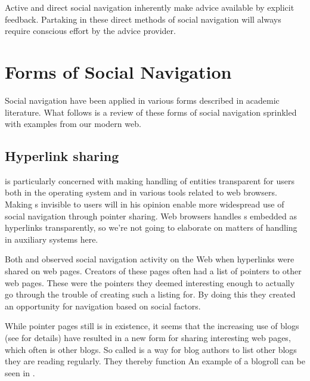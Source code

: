 Active and direct social navigation inherently make advice available by
explicit feedback. Partaking in these direct methods of social navigation
will always require conscious effort by the advice provider.

\section{Forms of Social Navigation}

Social navigation have been applied in various forms described in
academic literature. What follows is a review of these forms of social
navigation sprinkled with examples from our modern web.

\subsection{Hyperlink sharing}

\citet{dieberger97} is particularly concerned with making handling of
%
entities transparent for users both in the operating system and in various
tools related to web browsers. Making s invisible to users will in
his opinion enable more widespread use of social navigation through pointer
sharing. Web browsers handles s embedded as hyperlinks
transparently,
so we're not going to elaborate on matters of  handling in
auxiliary systems here.

Both \cite{dourish94} and \cite{dieberger97} observed social navigation
activity on the Web when hyperlinks were shared on web pages.
Creators of these pages often had a list of pointers to other web pages.
These were the pointers they deemed interesting enough to actually go
through the trouble of creating such a listing for. By doing this they created
an opportunity for navigation based on social factors.

While pointer pages still is in existence, it seems that the increasing
use of blogs (see  for details)
have resulted in a new form for sharing interesting web pages,
which often is other blogs. So called  is a way for blog
authors to list other blogs they are reading regularly. They thereby function
An example of a blogroll can be seen in .

